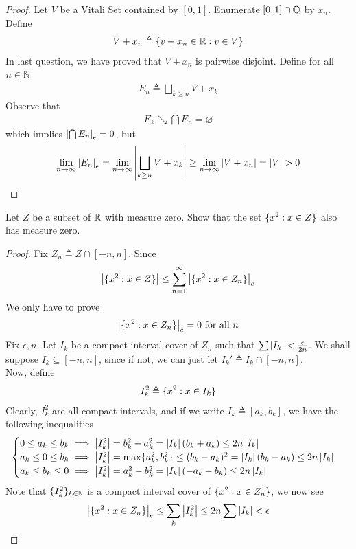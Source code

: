 \documentclass{report}
\begin{document}
\begin{proof}
Let $V$ be a Vitali Set contained by  $[0,1]$. Enumerate $[0,1]\cap \mathbb{Q}$ by $x_n$. Define 
\begin{align*}
V+x_n \triangleq \{ v+x_n\in\mathbb{R}: v\in V \}
\end{align*}
In last question, we have proved that $V+x_n$ is pairwise disjoint. Define for all $n\in\mathbb{N}$
\begin{align*}
E_n\triangleq \bigsqcup_{k\geq n}V+x_k  
\end{align*}
Observe that 
\begin{align*}
E_k \searrow \bigcap E_n =\varnothing 
\end{align*}
which implies $\left|\bigcap E_n\right|_e=0$, but 
\begin{align*}
\lim_{n\to \infty} \abso{E_n}_e =\lim_{n\to \infty} \abso{\bigsqcup_{k\geq n}V+x_k}\geq \lim_{n\to \infty} \abso{V+x_n}=\abso{V}>0
\end{align*}
\end{proof}
\begin{question}{}{}
Let $Z$ be a subset of $\mathbb{R}$ with measure zero. Show that the set $\{ x^2:x\in Z \}$ also has measure zero.
\end{question}
\begin{proof}
Fix $Z_n\triangleq Z\cap [-n,n]$. Since 
\begin{align*}
\left|\{ x^2:x \in Z \}\right|\leq \sum_{n=1}^{\infty} \left|\{ x^2:x\in Z_n \}\right|_e
\end{align*}
We only have to prove 
\begin{align*}
  \left|\{ x^2 : x \in Z_n \}\right|_e =0\text{ for all }n
\end{align*}
Fix $\epsilon ,n$. Let $I_k$ be a compact interval cover of  $Z_n$ such that $\sum \left|I_k\right| < \frac{\epsilon }{2n}$. We shall suppose $I_k \subseteq [-n,n]$, since if not, we can just let $I_k'\triangleq I_k \cap [-n,n]$.\\

Now, define 
\begin{align*}
I_k^2\triangleq \{ x^2 : x\in I_k \}
\end{align*}
Clearly, $I_k^2$ are all compact intervals, and if we write  $I_k \triangleq [a_k,b_k]$, we have the following inequalities 
\begin{align*}
\begin{cases}
  0 \leq a_k\leq b_k \implies  \left|I_k^2\right|=b_k^2-a_k^2= \left|I_k\right|(b_k+a_k)\leq 2n \left|I_k\right|  \\
  a_k\leq  0 \leq b_k \implies  \left|I_k^2\right| = \max \{ a_k^2,b_k^2 \}\leq (b_k-a_k)^2= \left|I_k\right|(b_k-a_k)\leq 2n \left|I_k\right| \\
  a_k \leq b_k \leq 0\implies \left|I_k^2\right|= a_k^2 - b_k^2 = \left|I_k\right|(-a_k-b_k)\leq 2n\left|I_k\right|
\end{cases}
\end{align*}
Note that $\{ I_k^2 \}_{k\in\mathbb{N}}$ is a compact interval cover  of $\{ x^2:x\in Z_n \}$, we now see 
\begin{align*}
\left|\{ x^2:x\in Z_n \}\right|_e \leq \sum_k \left|I_k^2\right| \leq 2n \sum \left|I_k\right|< \epsilon 
\end{align*}
\end{proof}
\end{document}
